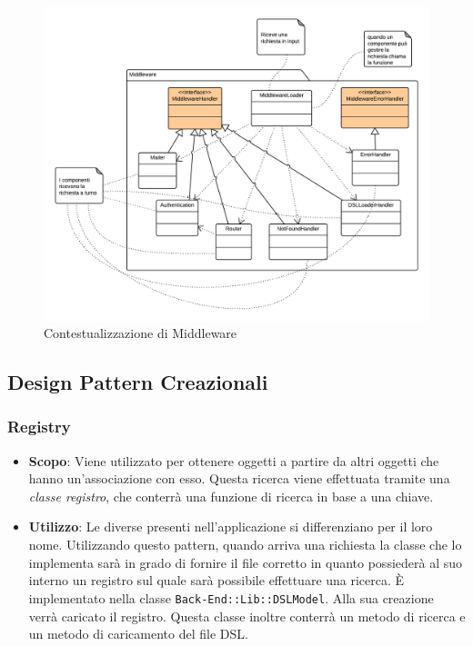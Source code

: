 \begin{figure}[H]
\centering \includegraphics[width=1\textwidth]{patterns/contestualizzazione/middleware.png}
\caption{Contestualizzazione di Middleware}
\label{fig:mvc}
\end{figure}

\subsection{Design Pattern Creazionali}

\subsubsection{Registry}

\begin{itemize}

	\item \textbf{Scopo}: Viene utilizzato per ottenere oggetti a partire da altri oggetti che hanno un'associazione con esso. Questa ricerca viene effettuata tramite una \textit{classe registro}, che conterrà una funzione di ricerca in base a una chiave.
	\item \textbf{Utilizzo}: Le diverse  presenti nell'applicazione si differenziano per il loro nome. Utilizzando questo pattern, quando arriva una richiesta la classe che lo implementa sarà in grado di fornire il file  corretto in quanto possiederà al suo interno un registro sul quale sarà possibile effettuare una ricerca. È implementato nella classe \texttt{Back-End::Lib::DSLModel}. Alla sua creazione verrà caricato il registro. Questa classe inoltre conterrà un metodo di ricerca e un metodo di caricamento del file DSL.

\end{itemize}


